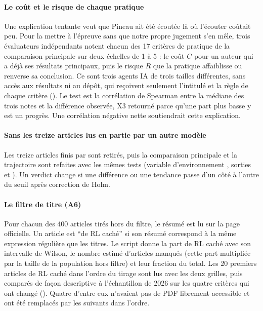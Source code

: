 \paragraph{Le coût et le risque de chaque pratique}
Une explication tentante veut que Pineau ait été écoutée là où l'écouter coûtait peu. Pour la mettre
à l'épreuve sans que notre propre jugement s'en mêle, trois
évaluateurs indépendants notent chacun des 17 critères de pratique de la comparaison principale sur deux échelles
de 1 à 5 : le coût $C$ pour un auteur qui a déjà ses résultats principaux, puis le risque $R$ que la
pratique affaiblisse ou renverse sa conclusion. Ce sont trois agents IA de trois
tailles différentes, sans accès aux résultats ni au dépôt, qui reçoivent seulement l'intitulé et la
règle de chaque critère (). Le test est la corrélation de Spearman entre la
médiane des trois notes et la différence observée, X3 retourné parce qu'une part plus basse y est un progrès.
Une corrélation négative nette soutiendrait cette explication.

\paragraph{Sans les treize articles lus en partie par un autre modèle}
Les treize articles finis par  sont retirés, puis la comparaison principale et la
trajectoire sont refaites avec les mêmes tests (variable d'environnement , sorties
 et ). Un verdict change si
une différence ou une tendance passe d'un côté à l'autre du seuil après correction de Holm.

\paragraph{Le filtre de titre (A6)}
Pour chacun des 400 articles tirés hors du filtre, le résumé est lu sur la page officielle. Un article
est \enquote{de RL caché} si son résumé correspond à la même expression régulière que les titres. Le
script  donne la part de RL caché avec son intervalle de Wilson, le nombre
estimé d'articles manqués (cette part multipliée par la taille de la population hors filtre) et leur
fraction du total. Les 20 premiers articles de RL caché dans l'ordre du tirage sont lus avec les deux
grilles, puis comparés de façon descriptive à l'échantillon de 2026 sur les quatre critères qui ont
changé (). Quatre d'entre eux n'avaient pas de PDF librement
accessible et ont été remplacés par les suivants dans l'ordre.

